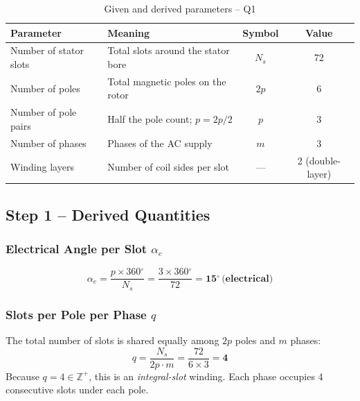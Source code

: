 \documentclass[12pt,a4paper]{article}
\newcommand{\degree}{\ensuremath{^{\circ}}}
\begin{document}
\begin{table}[H]
  \centering
  \caption{Given and derived parameters -- Q1}
  \label{tab:q1_params}
  \begin{tabular}{llcc}
    \toprule
    Parameter & Meaning & Symbol & Value \\
    \midrule
    Number of stator slots   & Total slots around the stator bore   & $N_s$      & 72 \\
    Number of poles          & Total magnetic poles on the rotor     & $2p$       & 6  \\
    Number of pole pairs     & Half the pole count; $p = 2p/2$       & $p$        & 3  \\
    Number of phases         & Phases of the AC supply               & $m$        & 3  \\
    Winding layers           & Number of coil sides per slot         & ---        & 2 (double-layer) \\
    \bottomrule
  \end{tabular}
\end{table}



\subsection{Step 1 -- Derived Quantities}

\subsubsection{Electrical Angle per Slot $\alpha_e$}

\begin{equation}
  \boxed{\alpha_e = \frac{p \times 360\degree}{N_s}}
  = \frac{3 \times 360\degree}{72} = \mathbf{15\degree\,\text{(electrical)}}
  \label{eq:alpha_e}
\end{equation}

\subsubsection{Slots per Pole per Phase $q$}

The total number of slots is shared equally among $2p$ poles and $m$ phases:
\begin{equation}
  \boxed{q = \frac{N_s}{2p \cdot m}}
  = \frac{72}{6 \times 3} = \mathbf{4}
  \label{eq:q}
\end{equation}
Because $q = 4 \in \mathbb{Z}^+$, this is an \emph{integral-slot} winding.
Each phase occupies 4 consecutive slots under each pole.
\end{document}
